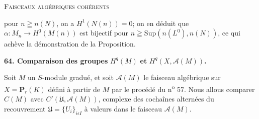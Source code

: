 \begin{center}
\end{center}





\textsc{Faisceaux algébriques cohérents}

 pour $n \geqq n(N)$, on a $H^1(N(n)) = 0$; on en déduit que $\alpha : M_n \to H^0(M(n))$ est bijectif pour $n \geqq \mathrm{Sup}(n(L^0), n(N))$, ce qui achève la démonstration de la Proposition.


\textbf{64. Comparaison des groupes} $H^q(M)$ \textbf{et} $H^q(X, \mathcal{A}(M))$\textbf{.}

Soit $M$ un $S$-module gradué, et soit $\mathcal{A}(M)$ le faisceau algébrique sur $X = \mathbf{P}_r(K)$ défini à partir de $M$ par le procédé du n\textsuperscript{o} 57. Nous allous comparer $C(M)$ avec $C'(\mathfrak{U}, \mathcal{A}(M))$, complexe des cochaînes alternées du recouvrement $\mathfrak{U} = \{U_i\}_{i \epsilon I}$ à valeurs dans le faisceau $\mathcal{A}(M)$.

